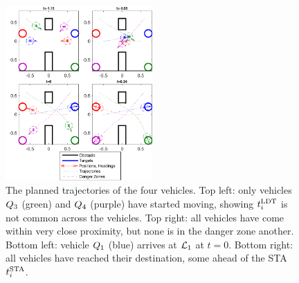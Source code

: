 \begin{figure}
	\centering
	\includegraphics[width=0.5\textwidth]{"fig/dubins_result"}
	\caption{The planned trajectories of the four vehicles. Top left: only vehicles $Q_3$ (green) and $Q_4$ (purple) have started moving, showing $t^\text{LDT}_i$ is not common across the vehicles. Top right: all vehicles have come within very close proximity, but none is in the danger zone another. Bottom left: vehicle $Q_1$ (blue) arrives at $\mathcal{L}_1$ at $t=0$. Bottom right: all vehicles have reached their destination, some ahead of the STA $t^\text{STA}_i$.}
	\label{fig:dubins_result}
\end{figure}